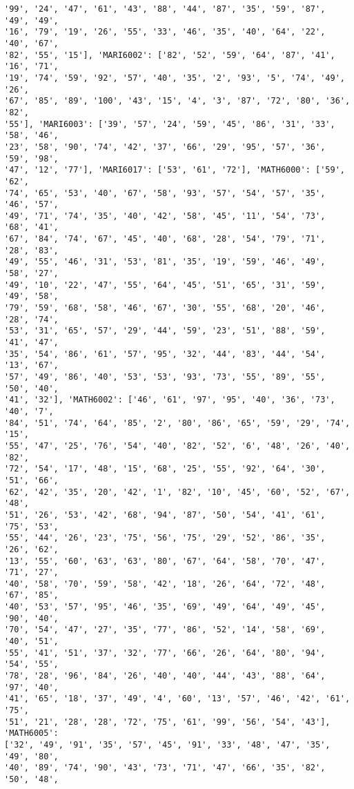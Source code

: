 \documentclass[11pt]{article}
\begin{document}
\begin{Verbatim}[commandchars=\\\{\}]
'99', '24', '47', '61', '43', '88', '44', '87', '35', '59', '87', '49', '49',
'16', '79', '19', '26', '55', '33', '46', '35', '40', '64', '22', '40', '67',
'82', '55', '15'], 'MARI6002': ['82', '52', '59', '64', '87', '41', '16', '71',
'19', '74', '59', '92', '57', '40', '35', '2', '93', '5', '74', '49', '26',
'67', '85', '89', '100', '43', '15', '4', '3', '87', '72', '80', '36', '82',
'55'], 'MARI6003': ['39', '57', '24', '59', '45', '86', '31', '33', '58', '46',
'23', '58', '90', '74', '42', '37', '66', '29', '95', '57', '36', '59', '98',
'47', '12', '77'], 'MARI6017': ['53', '61', '72'], 'MATH6000': ['59', '62',
'74', '65', '53', '40', '67', '58', '93', '57', '54', '57', '35', '46', '57',
'49', '71', '74', '35', '40', '42', '58', '45', '11', '54', '73', '68', '41',
'67', '84', '74', '67', '45', '40', '68', '28', '54', '79', '71', '28', '83',
'49', '55', '46', '31', '53', '81', '35', '19', '59', '46', '49', '58', '27',
'49', '10', '22', '47', '55', '64', '45', '51', '65', '31', '59', '49', '58',
'79', '59', '68', '58', '46', '67', '30', '55', '68', '20', '46', '28', '74',
'53', '31', '65', '57', '29', '44', '59', '23', '51', '88', '59', '41', '47',
'35', '54', '86', '61', '57', '95', '32', '44', '83', '44', '54', '13', '67',
'57', '49', '86', '40', '53', '53', '93', '73', '55', '89', '55', '50', '40',
'41', '32'], 'MATH6002': ['46', '61', '97', '95', '40', '36', '73', '40', '7',
'84', '51', '74', '64', '85', '2', '80', '86', '65', '59', '29', '74', '15',
'55', '47', '25', '76', '54', '40', '82', '52', '6', '48', '26', '40', '82',
'72', '54', '17', '48', '15', '68', '25', '55', '92', '64', '30', '51', '66',
'62', '42', '35', '20', '42', '1', '82', '10', '45', '60', '52', '67', '48',
'51', '26', '53', '42', '68', '94', '87', '50', '54', '41', '61', '75', '53',
'55', '44', '26', '23', '75', '56', '75', '29', '52', '86', '35', '26', '62',
'13', '55', '60', '63', '63', '80', '67', '64', '58', '70', '47', '71', '27',
'40', '58', '70', '59', '58', '42', '18', '26', '64', '72', '48', '67', '85',
'40', '53', '57', '95', '46', '35', '69', '49', '64', '49', '45', '90', '40',
'70', '54', '47', '27', '35', '77', '86', '52', '14', '58', '69', '40', '51',
'55', '41', '51', '37', '32', '77', '66', '26', '64', '80', '94', '54', '55',
'78', '28', '96', '84', '26', '40', '40', '44', '43', '88', '64', '97', '40',
'41', '65', '18', '37', '49', '4', '60', '13', '57', '46', '42', '61', '75',
'51', '21', '28', '28', '72', '75', '61', '99', '56', '54', '43'], 'MATH6005':
['32', '49', '91', '35', '57', '45', '91', '33', '48', '47', '35', '49', '80',
'40', '89', '74', '90', '43', '73', '71', '47', '66', '35', '82', '50', '48',

\end{Verbatim}
\end{document}
